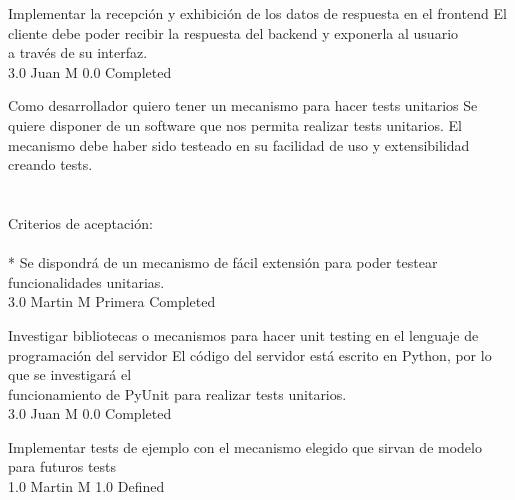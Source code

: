 		{Implementar la recepción y exhibición de los datos de respuesta en el frontend} %
		{El cliente debe poder recibir la respuesta del backend y exponerla al usuario\\
a través de su interfaz.\\
} %
		{3.0} %
		{Juan M} %
		{0.0} %
		{Completed} %


\vspace{20pt}

	{Como desarrollador quiero tener un mecanismo para hacer tests unitarios} %
	{Se quiere disponer de un software que nos permita realizar tests unitarios. El\\
mecanismo debe haber sido testeado en su facilidad de uso y extensibilidad\\
creando tests.\\
  \\
  \\
Criterios de aceptación:\\
  \\
* Se dispondrá de un mecanismo de fácil extensión para poder testear funcionalidades unitarias. \\
} %
	{} %
	{3.0} %
	{Martin M} %
	{Primera} %
	{Completed} %

		{Investigar bibliotecas o mecanismos para hacer unit testing en el lenguaje de programación del servidor} %
		{El código del servidor está escrito en Python, por lo que se investigará el\\
funcionamiento de PyUnit para realizar tests unitarios.\\
} %
		{3.0} %
		{Juan M} %
		{0.0} %
		{Completed} %

		{Implementar tests de ejemplo con el mecanismo elegido que sirvan de modelo para futuros tests} %
		{\\
} %
		{1.0} %
		{Martin M} %
		{1.0} %
		{Defined} %


\vspace{20pt}

